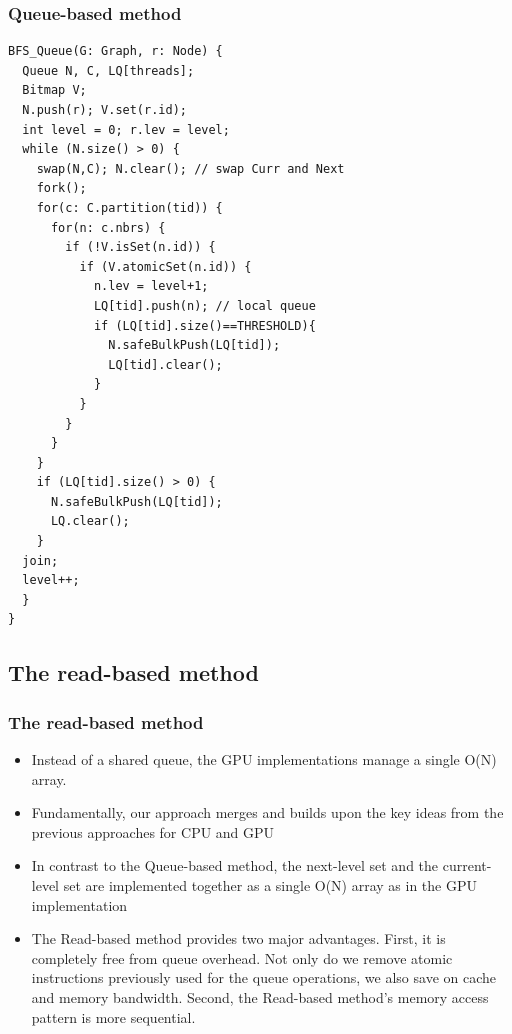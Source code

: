 \documentclass{beamer}
\begin{document}
\begin{frame}[fragile]
\frametitle{Queue-based method}
\begin{lstlisting}
BFS_Queue(G: Graph, r: Node) {
  Queue N, C, LQ[threads];
  Bitmap V;
  N.push(r); V.set(r.id);
  int level = 0; r.lev = level;
  while (N.size() > 0) {
    swap(N,C); N.clear(); // swap Curr and Next
    fork();
    for(c: C.partition(tid)) {
      for(n: c.nbrs) {
        if (!V.isSet(n.id)) {
          if (V.atomicSet(n.id)) {
            n.lev = level+1;
            LQ[tid].push(n); // local queue
            if (LQ[tid].size()==THRESHOLD){
              N.safeBulkPush(LQ[tid]);
              LQ[tid].clear();
            } 
          } 
        } 
      } 
    }
    if (LQ[tid].size() > 0) {
      N.safeBulkPush(LQ[tid]);
      LQ.clear();
    }
  join;
  level++;
  } 
}
\end{lstlisting}

\end{frame}
\begin{frame}
\subsection{The read-based method}
\frametitle{The read-based method}
\begin{itemize}
\item Instead of a shared queue, the
GPU implementations manage a single O(N) array.
\item Fundamentally, our approach merges and builds upon the key ideas from the previous approaches for CPU and GPU
\item In contrast to the Queue-based method,
the next-level set and the current-level set are implemented together as a single O(N) array as in the GPU implementation
\item The Read-based method provides two major advantages. First, it is completely free from queue overhead. Not only do we remove atomic instructions previously used for the queue
operations, we also save on cache and memory bandwidth. Second, the Read-based method’s memory access pattern is more sequential.
\end{itemize}

\end{frame}
\end{document}
